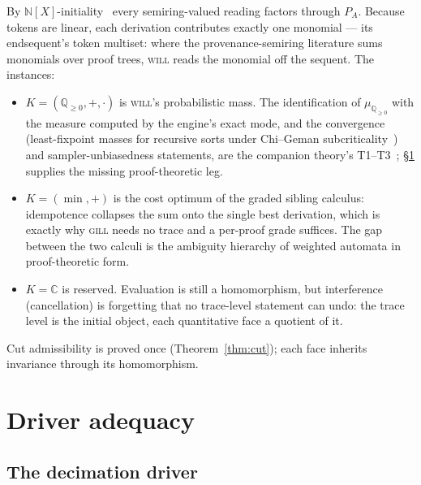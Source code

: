 \documentclass[11pt]{article}
\newcommand{\QQ}{\mathbb{Q}}                     %
\newcommand{\NN}{\mathbb{N}}                     %
\newcommand{\CC}{\mathbb{C}}                     %
\newcommand{\gill}{\textsc{gill}}                %
\newcommand{\will}{\textsc{will}}                %
\theoremstyle{definition}
\theoremstyle{remark}
\begin{document}
By $\NN[X]$-initiality~\cite{GreenKT2007} every semiring-valued reading
factors through $P_A$.  Because tokens are linear, each derivation
contributes exactly one monomial --- its endsequent's token multiset:
where the provenance-semiring literature sums monomials over proof
trees, \will{} reads the monomial off the sequent.  The instances:

\begin{itemize}
\item $K = (\QQ_{\geq0},+,\cdot)$ is \will{}'s probabilistic mass.
  The identification of $\mu_{\QQ_{\geq0}}$ with the measure computed
  by the engine's exact mode, and the convergence (least-fixpoint
  masses for recursive sorts under Chi--Geman
  subcriticality~\cite{ChiGeman1998,EtessamiYannakakis2009}) and
  sampler-unbiasedness statements, are the companion theory's
  T1--T3~\cite{THY0026}; \S\ref{sec:adequacy} supplies the missing
  proof-theoretic leg.
\item $K = (\min,+)$ is the cost optimum of the graded sibling
  calculus: idempotence collapses the sum onto the single best
  derivation, which is exactly why \gill{} needs no trace and a
  per-proof grade suffices.  The gap between the two calculi is the
  ambiguity hierarchy of weighted automata in proof-theoretic form.
\item $K = \CC$ is reserved.  Evaluation is still a homomorphism, but
  interference (cancellation) is forgetting that no trace-level
  statement can undo: the trace level is the initial object, each
  quantitative face a quotient of it.
\end{itemize}

Cut admissibility is proved once (Theorem~\ref{thm:cut}); each face
inherits invariance through its homomorphism.

\section{Driver adequacy}
\label{sec:adequacy}

\subsection{The decimation driver}
\end{document}
